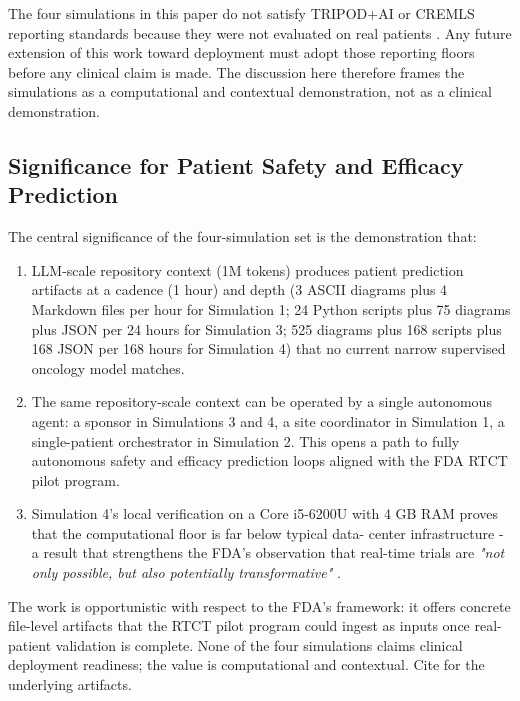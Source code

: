 The four simulations in this paper do not satisfy TRIPOD+AI or CREMLS
reporting standards because they were not evaluated on real patients
\cite{Collins2024TRIPODAI, ElEmam2024CREMLS}. Any future extension of
this work toward deployment must adopt those reporting floors before
any clinical claim is made. The discussion here therefore frames the
simulations as a computational and contextual demonstration, not as a
clinical demonstration.

\subsection{Significance for Patient Safety and Efficacy Prediction}
\label{sec:disc-significance}

The central significance of the four-simulation set is the
demonstration that:

\begin{enumerate}[leftmargin=*]
\item LLM-scale repository context (1M tokens) produces patient
prediction artifacts at a cadence (1 hour) and depth (3 ASCII
diagrams plus 4 Markdown files per hour for Simulation 1; 24 Python
scripts plus 75 diagrams plus JSON per 24 hours for Simulation 3;
525 diagrams plus 168 scripts plus 168 JSON per 168 hours for
Simulation 4) that no current narrow supervised oncology model
matches.

\item The same repository-scale context can be operated by a single
autonomous agent: a sponsor in Simulations 3 and 4, a site
coordinator in Simulation 1, a single-patient orchestrator in
Simulation 2. This opens a path to fully autonomous safety and
efficacy prediction loops aligned with the FDA RTCT pilot program.

\item Simulation 4's local verification on a Core i5-6200U with 4 GB
RAM proves that the computational floor is far below typical data-
center infrastructure - a result that strengthens the FDA's
observation that real-time trials are \emph{"not only possible, but
also potentially transformative"} \cite{fda2026realtime}.
\end{enumerate}

The work is opportunistic with respect to the FDA's framework: it
offers concrete file-level artifacts that the RTCT pilot program could
ingest as inputs once real-patient validation is complete. None of
the four simulations claims clinical deployment readiness; the value
is computational and contextual. Cite \cite{fda2026realtime,
kawchak_2026_19176370, kawchak_2026_19244918, kawchak_2026_18810541,
kawchak_2026_19119939, kawchak_2026_19396256} for the underlying
artifacts.

